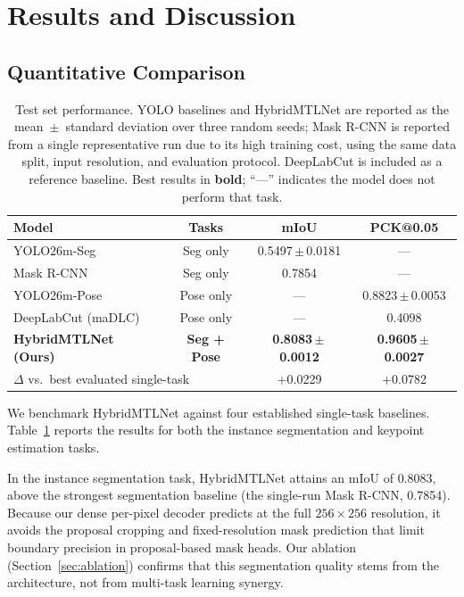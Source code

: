 \documentclass[runningheads]{llncs}
\newcommand{\mrcnnmiou}{0.7854}
\newcommand{\mrcnndelta}{+0.0229}
\begin{document}
\section{Results and Discussion}

\subsection{Quantitative Comparison}
\label{sec:quant}

\begin{table}[t]
\caption{Test set performance. YOLO baselines and HybridMTLNet are
reported as the mean~$\pm$~standard deviation over three random seeds;
Mask R-CNN is reported from a single representative run due to its high
training cost, using the same data split, input resolution, and
evaluation protocol. DeepLabCut is included as a reference baseline.
Best results in \textbf{bold}; ``—'' indicates the model does not
perform that task.}
\label{tab:results}
\centering
\begin{tabular}{lccc}
\toprule
\textbf{Model} & \textbf{Tasks} & \textbf{mIoU} & \textbf{PCK@0.05} \\
\midrule
YOLO26m-Seg          & Seg only  & 0.5497\,$\pm$\,0.0181 & —      \\
Mask R-CNN           & Seg only  & \mrcnnmiou & —      \\
YOLO26m-Pose         & Pose only & —      & 0.8823\,$\pm$\,0.0053 \\
DeepLabCut (maDLC)   & Pose only & —      & 0.4098 \\
\midrule
\textbf{HybridMTLNet (Ours)} & \textbf{Seg + Pose} & \textbf{0.8083\,$\pm$\,0.0012} & \textbf{0.9605\,$\pm$\,0.0027} \\
\midrule
\multicolumn{2}{l}{\(\Delta\) vs.\ best evaluated single-task} & \mrcnndelta & +0.0782 \\
\bottomrule
\end{tabular}
\end{table}

We benchmark HybridMTLNet against four established single-task
baselines. Table~\ref{tab:results} reports the results for both the
instance segmentation and keypoint estimation tasks.

In the instance segmentation task, HybridMTLNet attains an mIoU of
0.8083, above the strongest segmentation baseline (the single-run
Mask R-CNN, \mrcnnmiou). Because our dense per-pixel decoder predicts
at the full $256 \times 256$ resolution, it avoids the proposal cropping and
fixed-resolution mask prediction that limit boundary precision in
proposal-based mask heads. Our
ablation (Section~\ref{sec:ablation}) confirms that this segmentation
quality stems from the architecture, not from multi-task learning
synergy.
\end{document}
